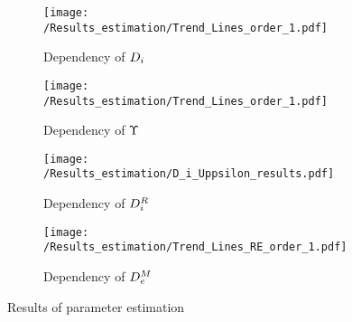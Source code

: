\documentclass[../Article_Model_Parameters.tex]{subfiles}
\begin{document}
		\begin{figure}[!h]
		\centering
		\begin{subfigure}[b]{0.49\columnwidth}
			\centering
			\texttt{[image: /Results\_estimation/Trend\_Lines\_order\_1.pdf]}
			\caption{Dependency of ${\color{black}D_i}$}
			\label{fig: results_DI}
		\end{subfigure}
		\begin{subfigure}[b]{0.49\columnwidth}
			\centering
			\texttt{[image: /Results\_estimation/Trend\_Lines\_order\_1.pdf]}
			\caption{Dependency of ${\color{black}\Upsilon}$}
			\label{fig: results_upsilon}
		\end{subfigure}
		\hfill
		\begin{subfigure}[b]{0.49\columnwidth}
			\texttt{[image: /Results\_estimation/D\_i\_Uppsilon\_results.pdf]}
			\caption{Dependency of ${\color{black}D^R_i}$}
			\label{fig:Di_upsilon_res}
		\end{subfigure}
		\begin{subfigure}[b]{0.49\columnwidth}
			\centering
			\texttt{[image: /Results\_estimation/Trend\_Lines\_RE\_order\_1.pdf]}
			\caption{Dependency of ${\color{black}D^M_e}$}
			\label{fig: results_De}
		\end{subfigure}
		\caption{Results of parameter estimation}
		\label{fig: estimation_results_DI_GAMMA}
	\end{figure}
	
\end{document}
